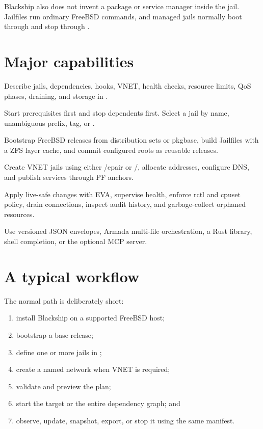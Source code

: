 Blackship also does not invent a package or service manager inside the jail.
Jailfiles run ordinary FreeBSD commands, and managed jails normally boot through
 and stop through .

\section{Major capabilities}

\begin{description}[style=nextline]
  \item[Declarative manifests]
    Describe jails, dependencies, hooks, VNET, health checks, resource limits,
    QoS phases, draining, and storage in .
  \item[Dependency-aware lifecycle]
    Start prerequisites first and stop dependents first. Select a jail by name,
    unambiguous prefix, tag, or .
  \item[Release and image management]
    Bootstrap FreeBSD releases from distribution sets or pkgbase, build Jailfiles
    with a ZFS layer cache, and commit configured roots as reusable releases.
  \item[Native networking]
    Create VNET jails using either /epair or
    /, allocate addresses, configure DNS,
    and publish services through PF anchors.
  \item[Operational control]
    Apply live-safe changes with EVA, supervise health, enforce rctl and cpuset
    policy, drain connections, inspect audit history, and garbage-collect
    orphaned resources.
  \item[Integration surfaces]
    Use versioned JSON envelopes, Armada multi-file orchestration, a Rust library,
    shell completion, or the optional MCP server.
\end{description}

\section{A typical workflow}

The normal path is deliberately short:

\begin{enumerate}
  \item install Blackship on a supported FreeBSD host;
  \item bootstrap a base release;
  \item define one or more jails in ;
  \item create a named network when VNET is required;
  \item validate and preview the plan;
  \item start the target or the entire dependency graph; and
  \item observe, update, snapshot, export, or stop it using the same manifest.
\end{enumerate}

